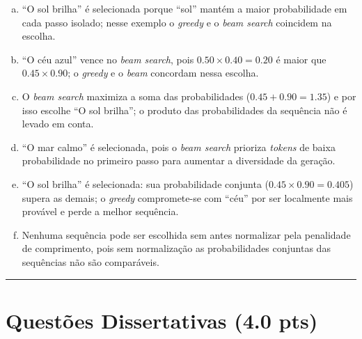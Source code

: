 \documentclass[11pt,a4paper]{article}
\begin{document}
\begin{enumerate}[1)]
\begin{enumerate}[a)]
    \item ``O sol brilha'' é selecionada porque ``sol'' mantém a maior probabilidade em cada passo isolado; nesse exemplo o \textit{greedy} e o \textit{beam search} coincidem na escolha.
    \item ``O céu azul'' vence no \textit{beam search}, pois $0.50 \times 0.40 = 0.20$ é maior que $0.45 \times 0.90$; o \textit{greedy} e o \textit{beam} concordam nessa escolha.
    \item O \textit{beam search} maximiza a soma das probabilidades ($0.45 + 0.90 = 1.35$) e por isso escolhe ``O sol brilha''; o produto das probabilidades da sequência não é levado em conta.
    \item ``O mar calmo'' é selecionada, pois o \textit{beam search} prioriza \textit{tokens} de baixa probabilidade no primeiro passo para aumentar a diversidade da geração.
    \item ``O sol brilha'' é selecionada: sua probabilidade conjunta ($0.45 \times 0.90 = 0.405$) supera as demais; o \textit{greedy} compromete-se com ``céu'' por ser localmente mais provável e perde a melhor sequência.
    \item Nenhuma sequência pode ser escolhida sem antes normalizar pela penalidade de comprimento, pois sem normalização as probabilidades conjuntas das sequências não são comparáveis.
\end{enumerate}

\end{enumerate}

\rule{\linewidth}{0.4pt}

\pagebreak
\section*{Questões Dissertativas (4.0 pts)}
\end{document}

